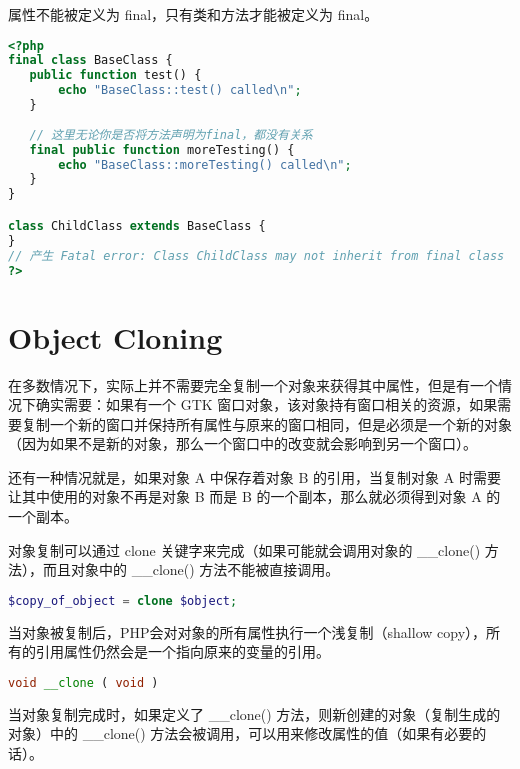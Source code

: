 属性不能被定义为 final，只有类和方法才能被定义为 final。



\begin{lstlisting}[language=PHP]
<?php
final class BaseClass {
   public function test() {
       echo "BaseClass::test() called\n";
   }
   
   // 这里无论你是否将方法声明为final，都没有关系
   final public function moreTesting() {
       echo "BaseClass::moreTesting() called\n";
   }
}

class ChildClass extends BaseClass {
}
// 产生 Fatal error: Class ChildClass may not inherit from final class (BaseClass)
?>
\end{lstlisting}

\chapter{Object Cloning}

在多数情况下，实际上并不需要完全复制一个对象来获得其中属性，但是有一个情况下确实需要：如果有一个 GTK 窗口对象，该对象持有窗口相关的资源，如果需要复制一个新的窗口并保持所有属性与原来的窗口相同，但是必须是一个新的对象（因为如果不是新的对象，那么一个窗口中的改变就会影响到另一个窗口）。

还有一种情况就是，如果对象 A 中保存着对象 B 的引用，当复制对象 A 时需要让其中使用的对象不再是对象 B 而是 B 的一个副本，那么就必须得到对象 A 的一个副本。

对象复制可以通过 clone 关键字来完成（如果可能就会调用对象的 \_\_clone() 方法），而且对象中的 \_\_clone() 方法不能被直接调用。

\begin{lstlisting}[language=PHP]
$copy_of_object = clone $object;
\end{lstlisting}

当对象被复制后，PHP会对对象的所有属性执行一个浅复制（shallow copy），所有的引用属性仍然会是一个指向原来的变量的引用。


\begin{lstlisting}[language=PHP]
void __clone ( void )
\end{lstlisting}

当对象复制完成时，如果定义了 \_\_clone() 方法，则新创建的对象（复制生成的对象）中的 \_\_clone() 方法会被调用，可以用来修改属性的值（如果有必要的话）。

